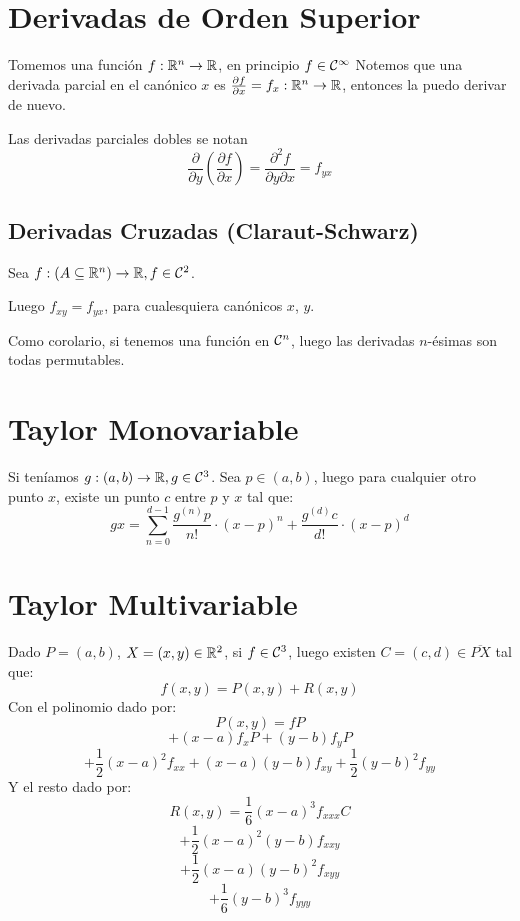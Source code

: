 \documentclass{article}
\begin{document}
\section*{Derivadas de Orden Superior}
Tomemos una función $f : \mathbb{R}^n \to \mathbb{R}$, en principio $f \in \mathcal{C}^\infty$
Notemos que una derivada parcial en el canónico $x$ es $\frac{\partial f}{\partial x }  = f_x: \mathbb{R}^n \to \mathbb{R}$, entonces la puedo derivar de nuevo.

Las derivadas parciales dobles se notan
\[
	\frac{\partial}{\partial y} \left(\frac{\partial f}{\partial x} \right) = \frac{\partial^2f}{\partial y \partial x}  = f_{yx}
\]

\subsection*{Derivadas Cruzadas (Claraut-Schwarz)}
Sea $f : (A \subseteq \mathbb{R}^n) \to \mathbb{R}, f \in \mathcal{C}^2$.

Luego $f_{xy} = f_{yx}$, para cualesquiera canónicos $x$, $y$.

Como corolario, si tenemos una función en $\mathcal{C}^n$, luego las derivadas $n$-ésimas son todas permutables.

\section*{Taylor Monovariable}
Si teníamos $g : (a, b) \to \mathbb{R}, g \in \mathcal{C}^3$. Sea $p \in (a, b)$, luego para cualquier otro punto $x$, existe un punto $c$ entre $p$ y $x$ tal que:
\[
	gx = \sum_{n=0}^{d-1} \frac{g^{(n)}p}{n!} \cdot (x-p)^n + \frac{g^{(d)}c}{d!} \cdot (x-p)^d
\]

\section*{Taylor Multivariable}
Dado $P = (a,b)$, $X = (x,y) \in \mathbb{R}^2$, si $f \in \mathcal{C}^3$, luego existen $C=(c,d)\in\overline{PX}$
tal que:
\[f (x,y) = P(x,y) + R(x,y)\]
Con el polinomio dado por:
\[P(x,y) = fP\]
\[ + (x-a)f_xP + (y-b)f_yP\]
\[ + \frac{1}{2}(x-a)^2f_{xx} + (x-a)(y-b)f_{xy} + \frac{1}{2}(y-b)^2f_{yy}\]
Y el resto dado por:
\[R(x,y) = \frac{1}{6}(x-a)^3f_{xxx} C\]
\[ + \frac{1}{2}(x-a)^2(y-b)f_{xxy}\]
\[ + \frac{1}{2}(x-a)(y-b)^2f_{xyy}\]
\[ + \frac{1}{6}(y-b)^3f_{yyy}\]
\end{document}
